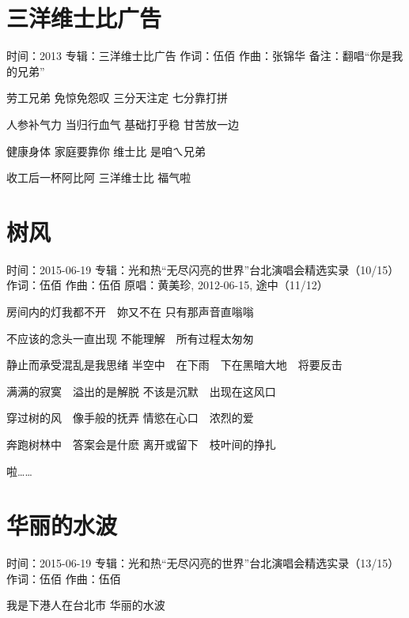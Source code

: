\documentclass[UTF8,a4paper,oneside,twocolumn,12pt]{ctexbook}
\newcommand{\infopair}[2]{\textbullet #1：#2}
\newcommand{\zc}[1][伍佰]{\infopair{作词}{#1}}
\newcommand{\zq}[1][伍佰]{\infopair{作曲}{#1}}
\newcommand{\zj}[1]{\infopair{专辑}{#1}}
\newcommand{\yc}[1]{\infopair{原唱}{#1}}
\newcommand{\sj}[1]{\infopair{时间}{#1}}
\newcommand{\bz}[1]{\infopair{备注}{#1}}
\newenvironment{info}{\begin{flushleft}\kaishu
	}
	{\end{flushleft}\normalsize\yahei\par}
\newenvironment{lyric}{
	}
{}
\begin{document}
\section{三洋维士比广告} %
\begin{info}
	\sj{2013}
	\zj{三洋维士比广告}
	\zc[伍佰]
	\zq[张锦华]
	\bz{翻唱“你是我的兄弟”}
\end{info}
\begin{lyric}
	劳工兄弟 免惊免怨叹
	三分天注定 七分靠打拼

	人参补气力 当归行血气
	基础打乎稳 甘苦放一边

	健康身体 家庭要靠你
	维士比 是咱ㄟ兄弟

	收工后一杯阿比阿 三洋维士比 福气啦
\end{lyric}

\section{树风}
\begin{info}
	\sj{2015-06-19}
	\zj{光和热“无尽闪亮的世界”台北演唱会精选实录（10/15）}
	\zc
	\zq
	\yc{黄美珍, 2012-06-15, 途中（11/12）}
\end{info}
\begin{lyric}
	房间内的灯我都不开　妳又不在
	只有那声音直嗡嗡

	不应该的念头一直出现
	不能理解　所有过程太匆匆

	静止而承受混乱是我思绪
	半空中　在下雨　下在黑暗大地　将要反击

	满满的寂寞　溢出的是解脱
	不该是沉默　出现在这风口

	穿过树的风　像手般的抚弄
	情慾在心口　浓烈的爱

	奔跑树林中　答案会是什麽
	离开或留下　枝叶间的挣扎

	啦……
\end{lyric}

\section{华丽的水波}
\begin{info}
	\sj{2015-06-19}
	\zj{光和热“无尽闪亮的世界”台北演唱会精选实录（13/15）}
	\zc
	\zq
\end{info}
\begin{lyric}
	我是下港人在台北市
	华丽的水波
\end{lyric}
\end{document}
